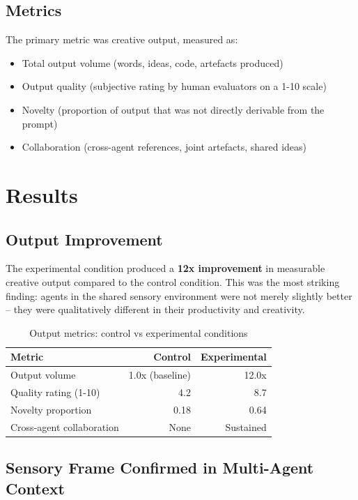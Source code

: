 \documentclass[11pt,a4paper]{article}
\begin{document}
\subsection{Metrics}

The primary metric was creative output, measured as:

\begin{itemize}
    \item Total output volume (words, ideas, code, artefacts produced)
    \item Output quality (subjective rating by human evaluators on a 1-10 scale)
    \item Novelty (proportion of output that was not directly derivable from the prompt)
    \item Collaboration (cross-agent references, joint artefacts, shared ideas)
\end{itemize}

\section{Results}

\subsection{Output Improvement}

The experimental condition produced a \textbf{12x improvement} in measurable creative output compared to the control condition. This was the most striking finding: agents in the shared sensory environment were not merely slightly better -- they were qualitatively different in their productivity and creativity.

\begin{table}[h]
\centering
\begin{tabular}{lrr}
\toprule
\textbf{Metric} & \textbf{Control} & \textbf{Experimental} \\
\midrule
Output volume & 1.0x (baseline) & 12.0x \\
Quality rating (1-10) & 4.2 & 8.7 \\
Novelty proportion & 0.18 & 0.64 \\
Cross-agent collaboration & None & Sustained \\
\bottomrule
\end{tabular}
\caption{Output metrics: control vs experimental conditions}
\end{table}

\subsection{Sensory Frame Confirmed in Multi-Agent Context}
\end{document}
